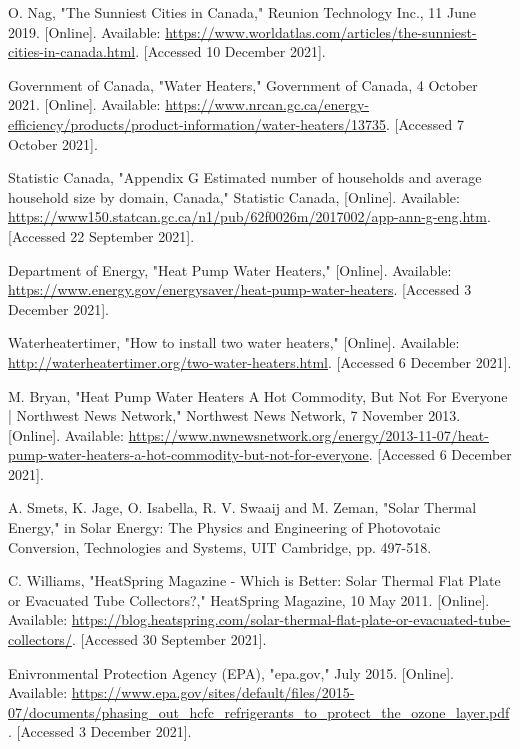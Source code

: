 \documentclass{ucalgarythesis}
\begin{document}
\begin{thebibliography}{9}
\raggedright
     O. Nag, "The Sunniest Cities in Canada," Reunion Technology Inc., 11 June 2019. [Online]. Available: \url{https://www.worldatlas.com/articles/the-sunniest-cities-in-canada.html}. [Accessed 10 December 2021].
    
     Government of Canada, "Water Heaters," Government of Canada, 4 October 2021. [Online]. Available: \url{https://www.nrcan.gc.ca/energy-efficiency/products/product-information/water-heaters/13735}. [Accessed 7 October 2021].
    
     Statistic Canada, "Appendix G Estimated number of households and average household size by domain, Canada," Statistic Canada, [Online]. Available: \url{https://www150.statcan.gc.ca/n1/pub/62f0026m/2017002/app-ann-g-eng.htm}. [Accessed 22 September 2021].
    
     Department of Energy, "Heat Pump Water Heaters," [Online]. Available: \url{https://www.energy.gov/energysaver/heat-pump-water-heaters}. [Accessed 3 December 2021].
    
     Waterheatertimer, "How to install two water heaters," [Online]. Available: \url{http://waterheatertimer.org/two-water-heaters.html}. [Accessed 6 December 2021].
    
     M. Bryan, "Heat Pump Water Heaters A Hot Commodity, But Not For Everyone | Northwest News Network," Northwest News Network, 7 November 2013. [Online]. Available: \url{https://www.nwnewsnetwork.org/energy/2013-11-07/heat-pump-water-heaters-a-hot-commodity-but-not-for-everyone}. [Accessed 6 December 2021].
    
     A. Smets, K. Jage, O. Isabella, R. V. Swaaij and M. Zeman, "Solar Thermal Energy," in Solar Energy: The Physics and Engineering of Photovotaic Conversion, Technologies and Systems, UIT Cambridge, pp. 497-518.
    
     C. Williams, "HeatSpring Magazine - Which is Better: Solar Thermal Flat Plate or Evacuated Tube Collectors?," HeatSpring Magazine, 10 May 2011. [Online]. Available: \url{https://blog.heatspring.com/solar-thermal-flat-plate-or-evacuated-tube-collectors/}. [Accessed 30 September 2021].
    
     Enivronmental Protection Agency (EPA), "epa.gov," July 2015. [Online]. Available: \url{https://www.epa.gov/sites/default/files/2015-07/documents/phasing_out_hcfc_refrigerants_to_protect_the_ozone_layer.pdf}. [Accessed 3 December 2021].
    

\end{thebibliography}
\end{document}
